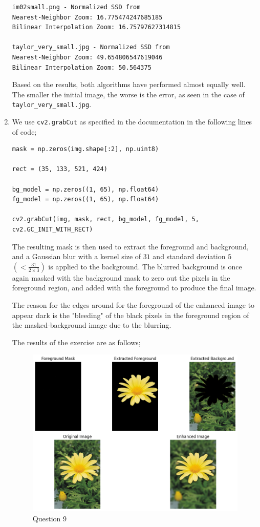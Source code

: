 \documentclass{article}[a4paper]
\begin{document}
\begin{enumerate}
\begin{verbatim}
im02small.png - Normalized SSD from
Nearest-Neighbor Zoom: 16.775474247685185
Bilinear Interpolation Zoom: 16.75797627314815

taylor_very_small.jpg - Normalized SSD from
Nearest-Neighbor Zoom: 49.654806547619046
Bilinear Interpolation Zoom: 50.564375\end{verbatim}Based on the results, both algorithms have performed almost equally well. The smaller the initial image, the worse is the error, as seen in the case 
	of \texttt{taylor\_very\_small.jpg}.

	\item We use \lstinline|cv2.grabCut| as specified in the documentation in the following lines of code;
	\begin{lstlisting}
mask = np.zeros(img.shape[:2], np.uint8)

rect = (35, 133, 521, 424)

bg_model = np.zeros((1, 65), np.float64)
fg_model = np.zeros((1, 65), np.float64)

cv2.grabCut(img, mask, rect, bg_model, fg_model, 5, cv2.GC_INIT_WITH_RECT)
	\end{lstlisting}
The resulting mask is then used to extract the foreground and background, and a Gaussian blur with a kernel size of $31$ and
standard deviation $5$ $\left(<\frac{31}{2 \times 3}\right)$ is applied to the background. The blurred background is once again masked
with the background mask to zero out the pixels in the foreground region, and added with the foreground to produce the final image.

The reason for the edges around for the foreground of the enhanced image to appear dark is the "bleeding" of the black pixels in the
foreground region of the masked-background image due to the blurring.

The results of the exercise are as follows;
\begin{figure}[H]
	\centering
	\includegraphics[width=0.9\linewidth]{images/q9.png}
	\caption{Question 9}
\end{figure}

\end{enumerate}
\end{document}
